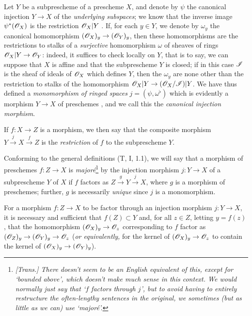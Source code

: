 \begin{env}[4.1.7]
\label{I.4.1.7}
Let $Y$ be a subprescheme of a prescheme $X$, and denote by $\psi$ the canonical injection $Y\to X$ of the \emph{underlying subspaces};
we know that the inverse image $\psi^*(\mathscr{O}_X)$ is the restriction $\mathscr{O}_X|Y$ .
If, for each $y\in Y$, we denote by $\omega_y$ the canonical homomorphism $(\sh{O}_X)_y\to(\sh{O}_Y)_y$, then these homomorphisms are the restrictions to stalks of a \emph{surjective} homomorphism $\omega$ of sheaves of rings $\sh{O}_X|Y\to\sh{O}_Y$: indeed, it suffices to check locally on $Y$, that is to say, we can suppose that $X$ is affine and that the subprescheme $Y$ is closed; if in this case $\mathscr{I}$ is the sheaf of ideals of $\mathscr{O}_X$ which defines $Y$, then the $\omega_y$ are none other than the restriction to stalks of the homomorphism $\sh{O}_X|Y\to(\sh{O}_X/\sh{I})|Y$.
We have thus defined a \emph{monomorphism of ringed spaces}  $j=(\psi,\omega^\flat)$ which is evidently a morphism $Y\to X$ of preschemes , and we call this the \emph{canonical injection morphism}.

If $f:X\to Z$ is a morphism, we then say that the composite morphism $Y\xrightarrow{j}X\xrightarrow{f}Z$ is the \emph{restriction} of $f$ to the subprescheme $Y$.
\end{env}

\begin{env}[4.1.8]
\label{I.4.1.8}
Conforming to the general definitions (T, I, 1.1), we will say that a morphism of preschemes $f:Z\to X$ is \emph{major\'e}\footnote{\emph{[Trans.] There doesn't seem to be an English equivalent of this, except for `bounded above', which doesn't make much sense in this context. We would normally just say that `$f$ factors through $j$', but to avoid having to entirely restructure the often-lengthy sentences in the original, we sometimes (but as little as we can) use `major\'e'.}} by the injection morphism $j:Y\to X$ of a subprescheme $Y$ of $X$ if $f$ factors as $Z\xrightarrow{g}Y\xrightarrow{j}X$, where $g$ is a morphism of preschemes;
further, $g$ is necessarily \emph{unique} since $j$ is a monomorphism.
\end{env}

\begin{proposition}[4.1.9]
\label{I.4.1.9}
For a morphism $f:Z\to X$ to be factor through an injection morphism $j:Y\to X$, it is necessary and sufficient that $f(Z)\subset Y$ and, for all $z\in Z$, letting $y=f(z)$, that the homomorphism $(\sh{O}_X)_y\to\sh{O}_z$ corresponding to $f$ factor as $(\sh{O}_Z)_y\to(\sh{O}_Y)_y\to\sh{O}_z$ (\emph{or equivalently,} for the kernel of $(\sh{O}_X)_y\to\sh{O}_z$ to contain the kernel of $(\sh{O}_X)_y\to(\sh{O}_Y)_y$).
\end{proposition}

